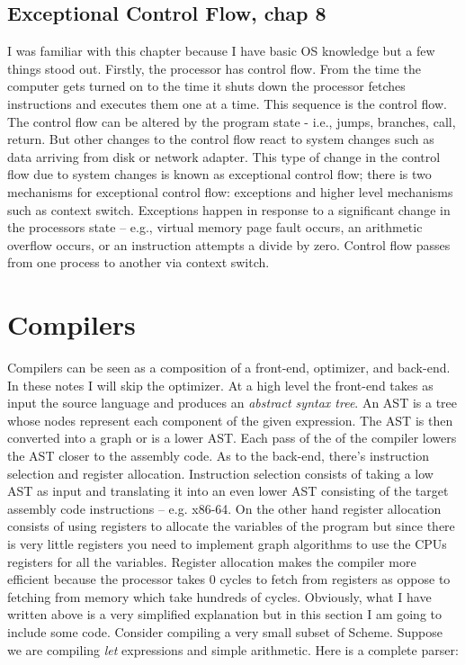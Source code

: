 \documentclass[10pt]{article}
\begin{document}
\subsection{Exceptional Control Flow, chap 8}
I was familiar with this chapter because I have basic OS knowledge but a few things stood out. Firstly, the processor has control flow. From the time the computer gets turned on to the time it shuts down the processor fetches instructions and executes them one at a time. This sequence is the control flow. The control flow can be altered by the program state - i.e., jumps, branches, call, return. But other changes to the control flow react to system changes such as data arriving from disk or network adapter. This type of change in the control flow due to system changes is known as exceptional control flow; there is two mechanisms for exceptional control flow: exceptions and higher level mechanisms such as context switch. Exceptions happen in response to a significant change in the processors  state -- e.g., virtual memory page fault occurs, an arithmetic overflow occurs, or an instruction attempts a divide by zero. Control flow passes from one process to another via context switch.

\section{Compilers}
Compilers can be seen as a composition of a front-end, optimizer, and back-end. In these notes I will skip the optimizer. At a high level the front-end takes as input the source language and produces an \textit{abstract syntax tree}. An AST is a tree whose nodes represent each component of the given expression. The AST is then converted into a graph or is a lower AST. Each pass of the of the compiler lowers the AST closer to the assembly code. As to the back-end, there's instruction selection and register allocation. Instruction selection consists of taking a low AST as input and translating it into an even lower AST consisting of the target assembly code instructions -- e.g. x86-64. On the other hand register allocation consists of using registers to allocate the variables of the program but since there is very little registers you need to implement graph algorithms to use the CPUs registers for all the variables. Register allocation makes the compiler more efficient because the processor takes 0 cycles to fetch from registers as oppose to fetching from memory which take hundreds of cycles. Obviously, what I have written above is a very simplified explanation but in this section I am going to include some code. Consider compiling a very small subset of Scheme. Suppose we are compiling \textit{let} expressions and simple arithmetic. Here is a complete parser:
\end{document}
